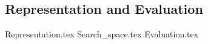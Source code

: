
\subsection{Representation and Evaluation}
\label{sec:bg:gp:repr_ev}
  {Representation.tex}
  {Search_space.tex}
  {Evaluation.tex}
